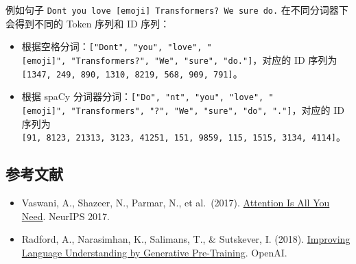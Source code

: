 例如句子 \texttt{Don\textquotesingle{}t\ you\ love\ {[}emoji{]}\ Transformers?\ We\ sure\ do.} 在不同分词器下会得到不同的 Token 序列和 ID 序列：

\begin{itemize}
\tightlist
\item
  根据空格分词：\texttt{{[}"Don\textquotesingle{}t",\ "you",\ "love",\ "{[}emoji{]}",\ "Transformers?",\ "We",\ "sure",\ "do."{]}}，对应的 ID 序列为 \texttt{{[}1347,\ 249,\ 890,\ 1310,\ 8219,\ 568,\ 909,\ 791{]}}。
\item
  根据 spaCy 分词器分词：\texttt{{[}"Do",\ "n\textquotesingle{}t",\ "you",\ "love",\ "{[}emoji{]}",\ "Transformers",\ "?",\ "We",\ "sure",\ "do",\ "."{]}}，对应的 ID 序列为 \texttt{{[}91,\ 8123,\ 21313,\ 3123,\ 41251,\ 151,\ 9859,\ 115,\ 1515,\ 3134,\ 4114{]}}。
\end{itemize}

\FloatBarrier
{}
\hypertarget{ux53c2ux8003ux6587ux732e-74}{%
\subsection{参考文献}\label{ux53c2ux8003ux6587ux732e-74}}

\vspace{0.25em}
\begin{itemize}
\tightlist
\item
  Vaswani, A., Shazeer, N., Parmar, N., et al.~(2017). \href{https://arxiv.org/abs/1706.03762}{Attention Is All You Need}. NeurIPS 2017.
\item
  Radford, A., Narasimhan, K., Salimans, T., \& Sutskever, I. (2018). \href{https://cdn.openai.com/research-covers/language-unsupervised/language_understanding_paper.pdf}{Improving Language Understanding by Generative Pre-Training}. OpenAI.
\end{itemize}

\clearpage
